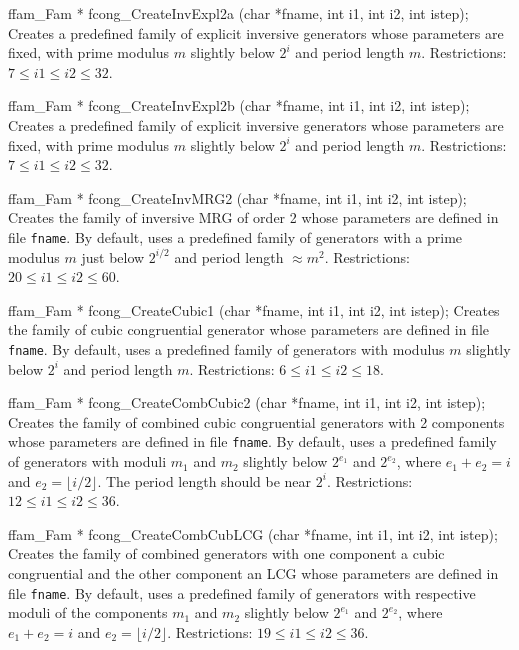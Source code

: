 ffam_Fam * fcong_CreateInvExpl2a (char *fname, int i1, int i2, int istep);
\endcode
\tab
 Creates a predefined family of explicit inversive generators whose
 parameters are fixed, with prime modulus $m$
 slightly below $2^i$ and period length $m$.
 Restrictions: $7 \le i1 \le i2 \le 32$.
\endtab
\code


ffam_Fam * fcong_CreateInvExpl2b (char *fname, int i1, int i2, int istep);
\endcode
\tab
 Creates a predefined family of explicit inversive generators whose
 parameters are fixed, with prime modulus $m$
 slightly below $2^i$ and period length $m$.
 Restrictions: $7 \le i1 \le i2 \le 32$.
\endtab
\code


ffam_Fam * fcong_CreateInvMRG2 (char *fname, int i1, int i2, int istep);
\endcode
\tab
 Creates the family of inversive MRG of order 2 whose
 parameters are defined in  file {\tt fname}. By default, uses
 a predefined family of generators with a prime modulus $m$
 just below $2^{i/2}$ and period length $\approx m^2$.
 Restrictions: $ 20 \le i1 \le i2 \le 60$.
\endtab
\code


ffam_Fam * fcong_CreateCubic1 (char *fname, int i1, int i2, int istep);
\endcode
\tab
 Creates the family of cubic congruential generator whose
 parameters are defined in  file {\tt fname}. By default, uses
 a predefined family of generators with modulus $m$
 slightly below $2^i$ and period length $m$.
 Restrictions: $6 \le i1 \le i2 \le 18$.
\endtab
\code


ffam_Fam * fcong_CreateCombCubic2 (char *fname, int i1, int i2, int istep);
\endcode
\tab
 Creates the family of combined cubic congruential generators with 2
 components whose parameters are defined in  file {\tt fname}. By default,
 uses a predefined family of generators with moduli $m_1$ and $m_2$
 slightly below $2^{e_1}$ and $2^{e_2}$, where $e_1 + e_2 = i$ and
 $e_2 = \lfloor i/2\rfloor$. The period length should be near $2^i$.
 Restrictions: $12 \le i1 \le i2 \le 36$.
\endtab
\code


ffam_Fam * fcong_CreateCombCubLCG (char *fname, int i1, int i2, int istep);
\endcode
\tab
 Creates the family of combined generators with one component a cubic
 congruential and the other component an LCG whose parameters are defined
 in file {\tt fname}. By default, uses a predefined family of generators
 with respective moduli of the components $m_1$ and $m_2$ slightly below
 $2^{e_1}$ and $2^{e_2}$, where $e_1 + e_2 = i$ and $e_2 = \lfloor i/2\rfloor$.
 Restrictions: $19 \le i1 \le i2 \le 36$.
\endtab




